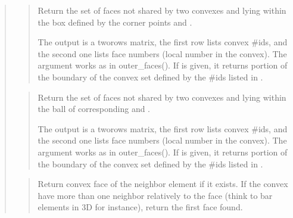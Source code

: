 \documentclass[a4paper,11pt,english]{sphinxmanual}
\begin{document}
\begin{quote}
\sphinxAtStartPar
{}
\begin{quote}

\sphinxAtStartPar
Return the set of faces not shared by two convexes and lying within the box defined by the corner points  and .

\sphinxAtStartPar
The output  is a two\sphinxhyphen{}rows matrix, the first row lists convex
\#ids, and the second one lists face numbers (local number in the
convex). The argument  works as in outer\_faces().
If  is given, it returns portion of the boundary of
the convex set defined by the \#ids listed in .
\end{quote}

\sphinxAtStartPar
{}
\begin{quote}

\sphinxAtStartPar
Return the set of faces not shared by two convexes and lying within the ball of corresponding  and .

\sphinxAtStartPar
The output  is a two\sphinxhyphen{}rows matrix, the first row lists convex
\#ids, and the second one lists face numbers (local number in the
convex). The argument  works as in outer\_faces().
If  is given, it returns portion of the boundary of
the convex set defined by the \#ids listed in .
\end{quote}

\sphinxAtStartPar
{}
\begin{quote}

\sphinxAtStartPar
Return convex face of the neighbor element if it exists.
If the convex have more than one neighbor
relatively to the face  (think to bar elements in 3D for instance),
return the first face found.
\end{quote}

\sphinxAtStartPar
{}
\begin{quote}


\end{quote}
\end{quote}
\end{document}
